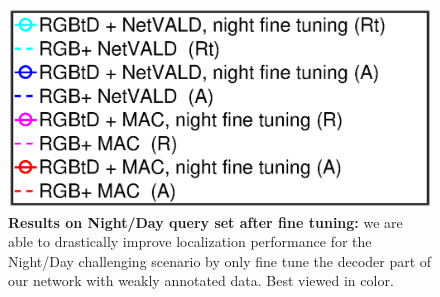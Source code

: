 \begin{figure}
	\includegraphics[trim={100 58 165 300},clip,width=0.4\linewidth]{plot/fig/legend_night}
	\caption{\label{fig:ft_night} \textbf{Results on Night/Day query set after fine tuning:} we are able to drastically improve localization performance for the Night/Day challenging scenario by only fine tune the decoder part of our network with weakly annotated data. Best viewed in color.}
\end{figure}
